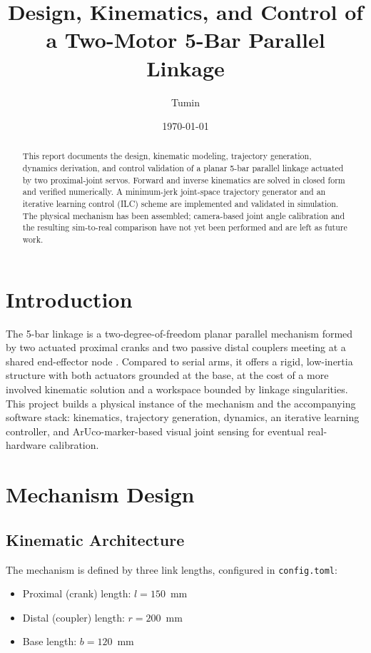 \documentclass[11pt]{article}
\title{Design, Kinematics, and Control of a Two-Motor 5-Bar Parallel Linkage}
\author{Tumin}
\date{\today}
\begin{document}
\maketitle

\begin{abstract}
This report documents the design, kinematic modeling, trajectory generation, dynamics derivation, and control validation of a planar 5-bar parallel linkage actuated by two proximal-joint servos. Forward and inverse kinematics are solved in closed form and verified numerically. A minimum-jerk joint-space trajectory generator and an iterative learning control (ILC) scheme are implemented and validated in simulation. The physical mechanism has been assembled; camera-based joint angle calibration and the resulting sim-to-real comparison have not yet been performed and are left as future work.
\end{abstract}

\section{Introduction}

The 5-bar linkage is a two-degree-of-freedom planar parallel mechanism formed by two actuated proximal cranks and two passive distal couplers meeting at a shared end-effector node \cite{gamble2020fivebar}. Compared to serial arms, it offers a rigid, low-inertia structure with both actuators grounded at the base, at the cost of a more involved kinematic solution and a workspace bounded by linkage singularities. This project builds a physical instance of the mechanism and the accompanying software stack: kinematics, trajectory generation, dynamics, an iterative learning controller, and ArUco-marker-based visual joint sensing for eventual real-hardware calibration.

\section{Mechanism Design}

\subsection{Kinematic Architecture}

The mechanism is defined by three link lengths, configured in \texttt{config.toml}:
\begin{itemize}
  \item Proximal (crank) length: $l = 150$~mm
  \item Distal (coupler) length: $r = 200$~mm
  \item Base length: $b = 120$~mm
\end{itemize}
\end{document}
